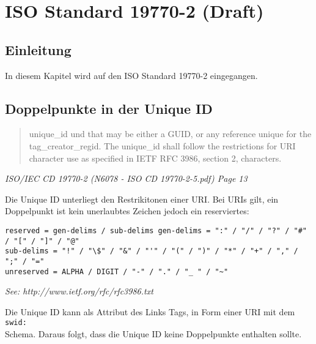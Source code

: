 \section{ISO Standard 19770-2 (Draft)}

\subsection{Einleitung}

In diesem Kapitel wird auf den ISO Standard 19770-2 eingegangen. 

\subsection{Doppelpunkte in der Unique ID}
\begin{quote}
unique\_id und that may be either a GUID, or any reference unique for the tag\_creator\_regid. The unique\_id shall 
follow the restrictions for URI character use as specified in IETF RFC 3986, section 2, characters.
\end{quote}
\textit{ISO/IEC CD 19770-2 (N6078 - ISO CD 19770-2-5.pdf) Page 13}

Die Unique ID unterliegt den Restrikitonen einer URI. Bei URIs gilt, ein Doppelpunkt ist kein unerlaubtes Zeichen jedoch ein reserviertes: 

\begin{verbatim}
reserved = gen-delims / sub-delims gen-delims = ":" / "/" / "?" / "#" / "[" / "]" / "@" 
sub-delims = "!" / "\$" / "&" / "'" / "(" / ")" / "*" / "+" / "," / ";" / "="
unreserved = ALPHA / DIGIT / "-" / "." / "_ " / "~"
\end{verbatim}

\textit{See: http://www.ietf.org/rfc/rfc3986.txt}

Die Unique ID kann als Attribut des Links Tags, in Form einer URI mit dem \texttt{swid:\\} Schema. Daraus folgt, dass die Unique ID keine Doppelpunkte enthalten sollte.
